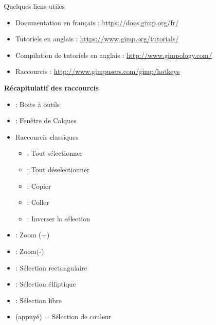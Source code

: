 \documentclass[10pt,svgnames,usenames,table]{beamer}
\begin{document}
\appendix 


\begin{frame}{Quelques liens utiles}
	\begin{itemize}
		\item Documentation en français : \url{https://docs.gimp.org/fr/}
		\item Tutoriels en anglais : \url{https://www.gimp.org/tutorials/}
		\item Compilation de tutoriels en anglais : \url{http://www.gimpology.com/}
		\item Raccourcis : \url{http://www.gimpusers.com/gimp/hotkeys}
	\end{itemize}
\end{frame}


\begin{frame}
	\textbf{Récapitulatif des raccourcis}
	\begin{itemize}
	\item {} : Boite à outils
	\item {} : Fenêtre de Calques
	\item Raccourcis classiques 
	\begin{itemize}
	 \item {} : Tout sélectionner
	 \item {} : Tout déselectionner
	 \item {} : Copier
	 \item {} : Coller
	 \item {} : Inverser la sélection
	\end{itemize}
	\item \keys{{+}} : Zoom (+)
	\item \keys{-} : Zoom(-)
	\item {} : Sélection rectangulaire 
	\item {} : Sélection élliptique 
	\item {} : Sélection libre
	\item {} (appuyé) = Sélection de couleur
	\end{itemize}
	
	\begin{center}
	\end{center}
\end{frame}
\end{document}
